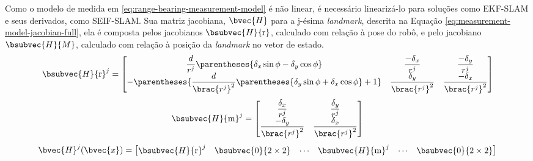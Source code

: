 Como o modelo de medida em \ref{eq:range-bearing-measurement-model} é não linear, é necessário linearizá-lo para soluções como EKF-SLAM e seus derivados, como SEIF-SLAM. Sua matriz jacobiana, $\bvec{H}$ para a j-ésima \textit{landmark}, descrita na Equação \ref{eq:measurement-model-jacobian-full}, 
ela é composta pelos jacobianos $\bsubvec{H}{\mathrm{r}}$, calculado com relação à pose do robô, e pelo jacobiano $\bsubvec{H}{M}$, calculado com relação à 
posição da \textit{landmark} no vetor de estado.
\renewcommand{\arraystretch}{2}
\begin{equation}
  \bsubvec{H}{\mathrm{r}}^j = \begin{bmatrix}
    \dfrac{d}{r^j}\parentheses{\delta_x \sin\phi - \delta_y \cos\phi} &  \dfrac{-\delta_x}{r^j} & \dfrac{-\delta_y}{r^j}\\
    -\parentheses{\dfrac{d}{\brac{r^j}^2}\parentheses{\delta_y \sin\phi + \delta_x \cos\phi} + 1} & \dfrac{\delta_y}{\brac{r^j}^2} & \dfrac{-\delta_x}{\brac{r^j}^2}
    \end{bmatrix}
  \label{eq:measurement-model-jacobian-robot-part}
\end{equation}
\renewcommand{\arraystretch}{2}
\begin{equation}
  \bsubvec{H}{\mathrm{m}}^j = \begin{bmatrix}
      \dfrac{\delta_x}{r^j} & \dfrac{\delta_y}{r^j} \\
      \dfrac{-\delta_y}{\brac{r^j}^2} & \dfrac{\delta_x}{\brac{r^j}^2}
    \end{bmatrix}
  \label{eq:measurement-model-jacobian-map-part}
\end{equation}
\renewcommand{\arraystretch}{1}
\begin{equation}
  \bvec{H}^j(\bvec{x}) = \begin{bmatrix}
    \bsubvec{H}{\mathrm{r}}^j & \bsubvec{0}{2\times 2} & \cdots & \bsubvec{H}{\mathrm{m}}^j & \cdots & \bsubvec{0}{2\times 2}
  \end{bmatrix} 
  \label{eq:measurement-model-jacobian-full}
\end{equation}

